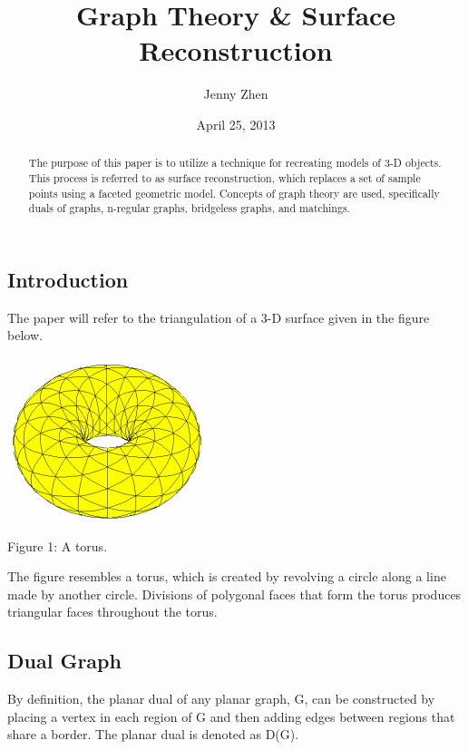 \documentclass[12pt]{article}
\begin{document}
\title{Graph Theory \& Surface Reconstruction}
\author{Jenny Zhen}
\date{April 25, 2013}
\maketitle

\begin{abstract}The purpose of this paper is to utilize a technique for recreating models of 3-D objects. This process is referred to as surface reconstruction, which replaces a set of sample points using a faceted geometric model. Concepts of graph theory are used, specifically duals of graphs, n-regular graphs, bridgeless graphs, and matchings.
\end{abstract}

\begin{flushleft}
\section*{Introduction}
The paper will refer to the triangulation of a 3-D surface given in the figure below.

\begin{center}
\includegraphics[scale=1]{images/torus1.png}\\
Figure 1: A torus.
\end{center}

The figure resembles a torus, which is created by revolving a circle along a line made by another circle. Divisions of polygonal faces that form the torus produces triangular faces throughout the torus.

\subsection*{Dual Graph}
By definition, the planar dual of any planar graph, G, can be constructed by placing a vertex in each region of G and then adding edges between regions that share a border. The planar dual is denoted as D(G).


\end{flushleft}
\end{document}
